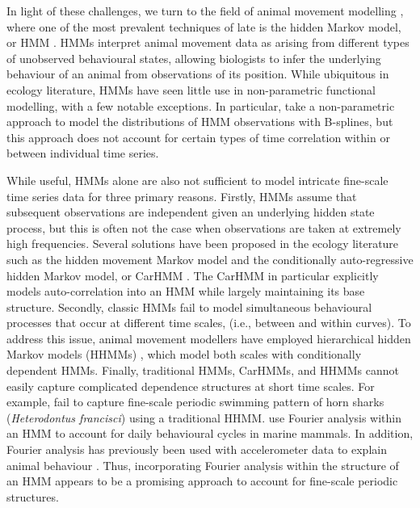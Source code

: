 In light of these challenges, we turn to the field of
animal movement modelling \citep{Hooten:2017}, where one of the most prevalent techniques of late is the hidden Markov model, or HMM \citep{Patterson:2017,McClintock:2020}. HMMs interpret animal movement data as arising from different types of unobserved behavioural states, allowing biologists to infer the underlying behaviour of an animal from observations of its position. While ubiquitous in ecology literature, HMMs have seen little use in non-parametric functional modelling, with a few notable exceptions. In particular, \citet{Langrock:2018} take a non-parametric approach to model the distributions of HMM observations with B-splines, 
but this approach does not account for certain types of time correlation within or between individual time series.

While useful, HMMs alone are also not sufficient to model intricate fine-scale time series data for three primary reasons.
%
Firstly, HMMs assume that subsequent observations are independent given an underlying hidden state process, but this is often not the case when observations are taken at extremely high frequencies. 
Several solutions have been proposed in the ecology literature such as the hidden movement Markov model \citep{Whoriskey:2016} and the conditionally auto-regressive hidden Markov model, or CarHMM \citep{Lawler:2019}. The CarHMM in particular explicitly models auto-correlation into an HMM while largely maintaining its base structure. 
%
Secondly, classic HMMs fail to model simultaneous behavioural processes that occur at different time scales, (i.e., between and within curves). 
To address this issue, animal movement modellers have employed hierarchical hidden Markov models (HHMMs) \citep{Barajas:2017,Adam:2019}, which model both scales with conditionally dependent HMMs.
%
Finally, traditional HMMs, CarHMMs, and HHMMs cannot easily capture complicated dependence structures at short time scales. For example, \citet{Adam:2019} fail to capture fine-scale periodic swimming pattern of horn sharks (\textit{Heterodontus francisci}) using a traditional HHMM. \citet{Heerah:2017} use Fourier analysis within an HMM to account for %
daily behavioural cycles in marine mammals. In addition, Fourier analysis has previously been used with accelerometer data to explain animal behaviour \citep{Fehlmann:2017,Shorter:2017}. Thus, incorporating Fourier analysis within the structure of an HMM appears to be a promising approach to account for fine-scale periodic structures.

